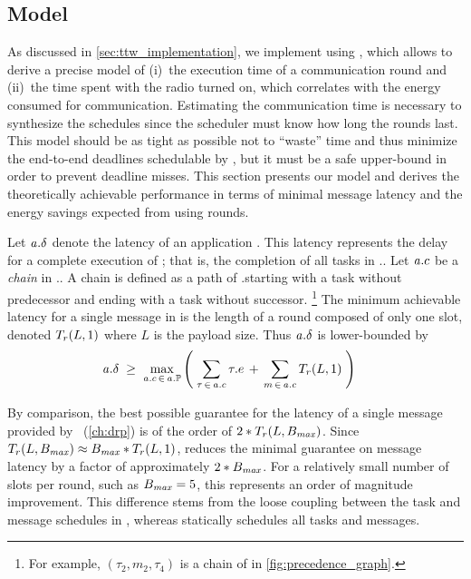 \subsection{\TTnet Model}
\label{subsec:model}
As discussed in \cref{sec:ttw_implementation}, we implement \TTnet using \baloo, which allows to derive a precise model of
(i)~the execution time of a communication round and
(ii)~the time spent with the radio turned on, which correlates with the energy consumed for communication.
Estimating the communication time is necessary to synthesize the schedules since the scheduler must know how long the rounds last.
This model should be as tight as possible not to ``waste'' time and thus minimize the end-to-end deadlines schedulable by \TTW, but it must be a safe upper-bound in order to prevent deadline misses.
This section presents our \TTnet model and derives the theoretically achievable performance in terms of minimal message latency and the energy savings expected from using rounds.

Let $\mathit{a_{}}.\delta$ denote the latency of an application \app. This latency represents the delay for a complete execution of \app; that is, the completion of all tasks in \app.\predG. Let $\mathit{a_{}}.c$ be a \emph{chain} in \app.\predG.
A chain is defined as a path of \app.\predG starting with a task without predecessor and ending with a task without successor.%
%
\footnote{For example, $(\tau_2, m_2, \tau_4)$ is a chain of \predG in \cref{fig:precedence_graph}.}
%
The minimum achievable latency for a single message in \TTW is the length of a round composed of only one slot, denoted $T_{r}(L,1)$ where $L$ is the payload size. Thus $\mathit{a_{}}.\delta$ is lower-bounded by
\begin{align}
\label{eq:min_deadline}
\mathit{a_{}}.\delta \;
	& \geq \; \max_{\mathit{a_{}}.c \,\in\, \mathit{a_{}}.\mathbb{P}}
		\left(
			\; \sum_{\tau \, \in \, \mathit{a_{}}.c} \tau.e \,+\, \sum_{m \, \in \, \mathit{a_{}}.c} T_{r}(L,1) \;
		\right)
\end{align}

\begin{remark}
  By comparison, the best possible guarantee for the latency of a single message provided by  \DRP~(\cref{ch:drp}) is of the order of $2*T_{r}(L,B_{\mathit{max}})$.
  Since $T_{r}(L,B_{\mathit{max}}) \approx B_{\mathit{max}}*T_{r}(L,1)$, \TTW reduces the minimal guarantee on message latency by a factor of approximately $2*B_{\mathit{max}}$.
  For a relatively small number of slots per round, such as $B_{\mathit{max}}=5$, this represents an order of magnitude improvement.
  This difference stems from the loose coupling between the task and message schedules in \DRP, whereas \TTW statically schedules all tasks and messages.
\end{remark}



